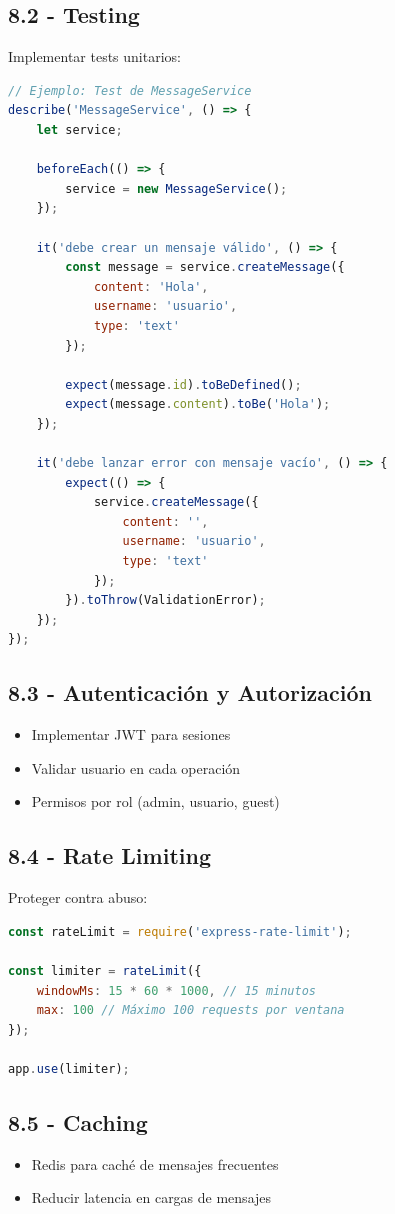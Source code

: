 \documentclass[12pt,a4paper]{article}
\begin{document}
\subsection{8.2 - Testing}
Implementar tests unitarios:
\begin{lstlisting}[language=JavaScript]
// Ejemplo: Test de MessageService
describe('MessageService', () => {
    let service;

    beforeEach(() => {
        service = new MessageService();
    });

    it('debe crear un mensaje válido', () => {
        const message = service.createMessage({
            content: 'Hola',
            username: 'usuario',
            type: 'text'
        });

        expect(message.id).toBeDefined();
        expect(message.content).toBe('Hola');
    });

    it('debe lanzar error con mensaje vacío', () => {
        expect(() => {
            service.createMessage({
                content: '',
                username: 'usuario',
                type: 'text'
            });
        }).toThrow(ValidationError);
    });
});
\end{lstlisting}

\subsection{8.3 - Autenticación y Autorización}
\begin{itemize}
    \item Implementar JWT para sesiones
    \item Validar usuario en cada operación
    \item Permisos por rol (admin, usuario, guest)
\end{itemize}

\subsection{8.4 - Rate Limiting}
Proteger contra abuso:
\begin{lstlisting}[language=JavaScript]
const rateLimit = require('express-rate-limit');

const limiter = rateLimit({
    windowMs: 15 * 60 * 1000, // 15 minutos
    max: 100 // Máximo 100 requests por ventana
});

app.use(limiter);
\end{lstlisting}

\subsection{8.5 - Caching}
\begin{itemize}
    \item Redis para caché de mensajes frecuentes
    \item Reducir latencia en cargas de mensajes
\end{itemize}
\end{document}
